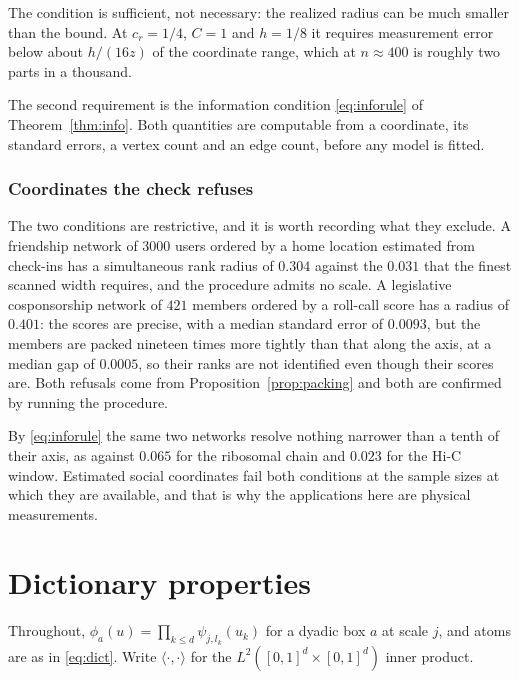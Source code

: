 \documentclass[11pt]{article}
\theoremstyle{definition}
\newcommand{\1}{\mathbf 1}\newcommand{\op}{\operatorname}
\begin{document}
The condition is sufficient, not necessary: the realized radius can be much
smaller than the bound.  At $c_r=1/4$, $C=1$ and $h=1/8$ it requires
measurement error below about $h/(16z)$ of the coordinate range, which at
$n\approx400$ is roughly two parts in a thousand.

The second requirement is the information condition \eqref{eq:inforule} of
Theorem~\ref{thm:info}.  Both quantities are computable from a coordinate, its
standard errors, a vertex count and an edge count, before any model is fitted.

\subsubsection{Coordinates the check refuses}

The two conditions are restrictive, and it is worth recording what they
exclude.  A friendship network of $3000$ users ordered by a home location
estimated from check-ins has a simultaneous rank radius of $0.304$ against the
$0.031$ that the finest scanned width requires, and the procedure admits no
scale.  A legislative cosponsorship network of $421$ members ordered by a
roll-call score has a radius of $0.401$: the scores are precise, with a median
standard error of $0.0093$, but the members are packed nineteen times more
tightly than that along the axis, at a median gap of $0.0005$, so their ranks
are not identified even though their scores are.  Both refusals come from
Proposition~\ref{prop:packing} and both are confirmed by running the
procedure.

By \eqref{eq:inforule} the same two networks resolve nothing narrower than a
tenth of their axis, as against $0.065$ for the ribosomal chain and $0.023$
for the Hi-C window.  Estimated social coordinates fail both conditions at the
sample sizes at which they are available, and that is why the applications
here are physical measurements.


\section{Dictionary properties}\label{sec:supp-dict}

Throughout, $\phi_a(u)=\prod_{k\le d}\psi_{j,l_k}(u_k)$ for a dyadic box $a$ at
scale $j$, and atoms are as in \eqref{eq:dict}.  Write $\langle\cdot,\cdot\rangle$
for the $L^2([0,1]^d\times[0,1]^d)$ inner product.
\end{document}
